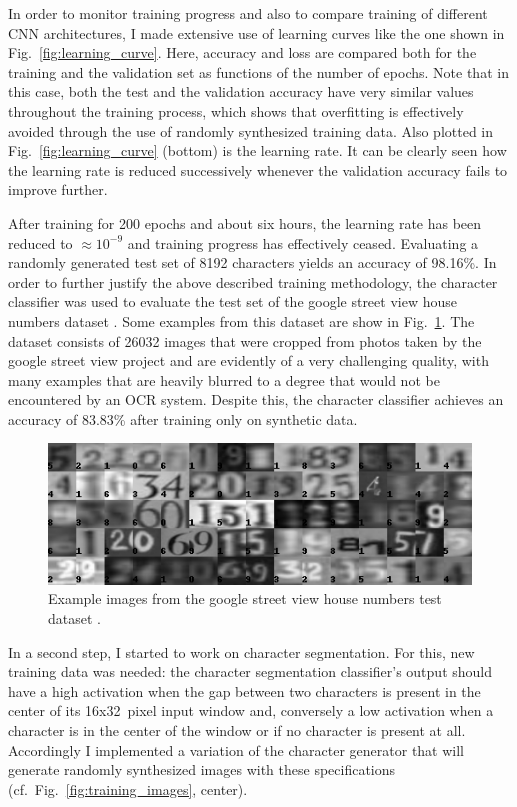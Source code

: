 \documentclass[11pt]{article}
\newcommand\figref[1]{Fig.~\ref{fig:#1}}
\begin{document}
In order to monitor training progress and also to compare training of different CNN architectures,
I made extensive use of learning curves like the one shown in \figref{learning_curve}.
Here, accuracy and loss are compared both for the training and the validation set as functions
of the number of epochs. Note that in this case, both the test and the validation accuracy
have very similar values throughout the training process,
which shows that overfitting is effectively avoided through
the use of randomly synthesized training data. Also plotted in \figref{learning_curve} (bottom)
is the learning rate. It can be clearly seen how the learning rate is reduced successively
whenever the validation accuracy fails to improve further.

After training for 200 epochs and about six hours, the learning rate has been reduced to $\approx 10^{-9}$ and training progress
has effectively ceased. Evaluating a randomly generated test set of 8192 characters yields
an accuracy of 98.16\%. In order to further justify the above described training methodology,
the character classifier was used to evaluate the test set of the google street view house numbers dataset
\cite{Netzer2011,TheStree9:online}. Some examples from this dataset are show in \figref{svhn_data}.
The dataset consists of 26032 images that were cropped from photos taken by the
google street view project and are evidently of a very challenging quality, with many examples that are heavily blurred to a
degree that would not be encountered by an OCR system. Despite this, the character classifier
achieves an accuracy of 83.83\% after training only on synthetic data.

\begin{figure}
  \centering
  \includegraphics[width=1.0\linewidth]{fig/svhn_test}
  \caption
  {
    Example images from the google street view house numbers test dataset \cite{Netzer2011,TheStree9:online}.
  }
  \label{fig:svhn_data}
\end{figure}

In a second step, I started to work on character segmentation. For this, new training
data was needed: the character segmentation classifier's output should have a high
activation when the gap between two characters is present in the center of its
16x32~pixel input window and, conversely a low activation when a character is in the
center of the window or if no character is present at all.
Accordingly I implemented a variation of the character generator that will generate
randomly synthesized images with these specifications (cf.~\figref{training_images}, center).
\end{document}
